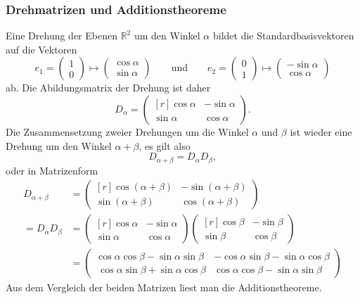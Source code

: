 \subsubsection{Drehmatrizen und Additionstheoreme}
Eine Drehung der Ebenen $\mathbb{R}^2$ um den Winkel $\alpha$ bildet
die Standardbasisvektoren auf die Vektoren
\[
e_1=\begin{pmatrix}1\\0\end{pmatrix}
\mapsto
\begin{pmatrix}
\cos\alpha\\\sin\alpha
\end{pmatrix}
\qquad\text{und}\qquad
e_2=\begin{pmatrix}0\\1\end{pmatrix}
\mapsto
\begin{pmatrix}
-\sin\alpha
\\
\cos\alpha
\end{pmatrix}
\]
ab.
Die Abildungsmatrix der Drehung ist daher
\[
D_\alpha
=
\begin{pmatrix*}[r]
\cos\alpha&-\sin\alpha\\
\sin\alpha& \cos\alpha
\end{pmatrix*}.
\]
Die Zusammensetzung zweier Drehungen um die Winkel $\alpha$ und $\beta$
ist wieder eine Drehung um den Winkel $\alpha+\beta$, es gilt
also
\[
D_{\alpha+\beta}
=
D_{\alpha}D_{\beta},
\]
oder in Matrizenform
\begin{align*}
D_{\alpha+\beta}
&=
\begin{pmatrix*}[r]
\cos(\alpha+\beta)&-\sin(\alpha+\beta) \\
\sin(\alpha+\beta)& \cos(\alpha+\beta)
\end{pmatrix*}
\\
=
D_{\alpha}D_{\beta}
&=
\begin{pmatrix*}[r]
\cos\alpha&-\sin\alpha\\
\sin\alpha&\cos\alpha
\end{pmatrix*}
\begin{pmatrix*}[r]
\cos\beta&-\sin\beta\\
\sin\beta&\cos\beta
\end{pmatrix*}
\\
&=
\begin{pmatrix}
\cos\alpha\cos\beta-\sin\alpha\sin\beta
	& -\cos\alpha\sin\beta -\sin\alpha\cos\beta\\\
\cos\alpha\sin\beta+\sin\alpha\cos\beta
	& \cos\alpha\cos\beta-\sin\alpha\sin\beta
\end{pmatrix}
\end{align*}
Aus dem Vergleich der beiden Matrizen liest man die Additionstheoreme.

